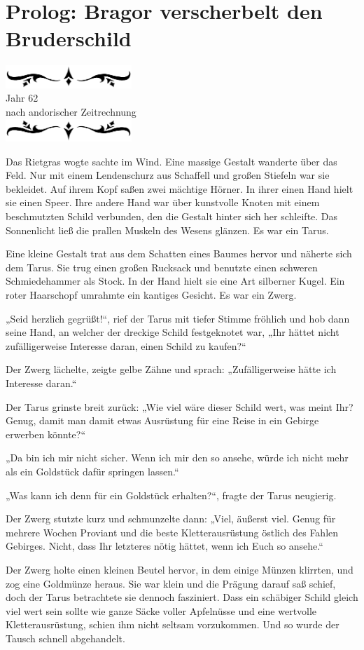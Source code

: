 \documentclass[10pt, a4paper, oneside]{book}
\newcommand{\az}[1]{%
    \begin{center}
        \includegraphics[width=180px]{Das Erbe des Wunderkindes/verzierung1.png}\\
        {\Huge #1} \\
        {nach andorischer Zeitrechnung}\\
        \includegraphics[width=180px]{Das Erbe des Wunderkindes/verzierung2.png}
    \end{center}
    \extramarks{}{#1 a.Z.}
}
\begin{document}
\section{Prolog: Bragor verscherbelt den Bruderschild}

\az{Jahr 62}

Das Rietgras wogte sachte im Wind. Eine massige Gestalt wanderte über das Feld. Nur mit einem Lendenschurz aus Schaffell und großen Stiefeln war sie bekleidet. Auf ihrem Kopf saßen zwei mächtige Hörner. In ihrer einen Hand hielt sie einen Speer. Ihre andere Hand war über kunstvolle Knoten mit einem beschmutzten Schild verbunden, den die Gestalt hinter sich her schleifte. Das Sonnenlicht ließ die prallen Muskeln des Wesens glänzen. Es war ein Tarus.

Eine kleine Gestalt trat aus dem Schatten eines Baumes hervor und näherte sich dem Tarus. Sie trug einen großen Rucksack und benutzte einen schweren Schmiedehammer als Stock. In der Hand hielt sie eine Art silberner Kugel. Ein roter Haarschopf umrahmte ein kantiges Gesicht. Es war ein Zwerg.

„Seid herzlich gegrüßt!“, rief der Tarus mit tiefer Stimme fröhlich und hob dann seine Hand, an welcher der dreckige Schild festgeknotet war, „Ihr hättet nicht zufälligerweise Interesse daran, einen Schild zu kaufen?“

Der Zwerg lächelte, zeigte gelbe Zähne und sprach: „Zufälligerweise hätte ich Interesse daran.“

Der Tarus grinste breit zurück: „Wie viel wäre dieser Schild wert, was meint Ihr? Genug, damit man damit etwas Ausrüstung für eine Reise in ein Gebirge erwerben könnte?“

„Da bin ich mir nicht sicher. Wenn ich mir den so ansehe, würde ich nicht mehr als ein Goldstück dafür springen lassen.“

„Was kann ich denn für ein Goldstück erhalten?“, fragte der Tarus neugierig.

Der Zwerg stutzte kurz und schmunzelte dann: „Viel, äußerst viel. Genug für mehrere Wochen Proviant und die beste Kletterausrüstung östlich des Fahlen Gebirges. Nicht, dass Ihr letzteres nötig hättet, wenn ich Euch so ansehe.“

Der Zwerg holte einen kleinen Beutel hervor, in dem einige Münzen klirrten, und zog eine Goldmünze heraus. Sie war klein und die Prägung darauf saß schief, doch der Tarus betrachtete sie dennoch fasziniert. Dass ein schäbiger Schild gleich viel wert sein sollte wie ganze Säcke voller Apfelnüsse und eine wertvolle Kletterausrüstung, schien ihm nicht seltsam vorzukommen. Und so wurde der Tausch schnell abgehandelt.
\end{document}
